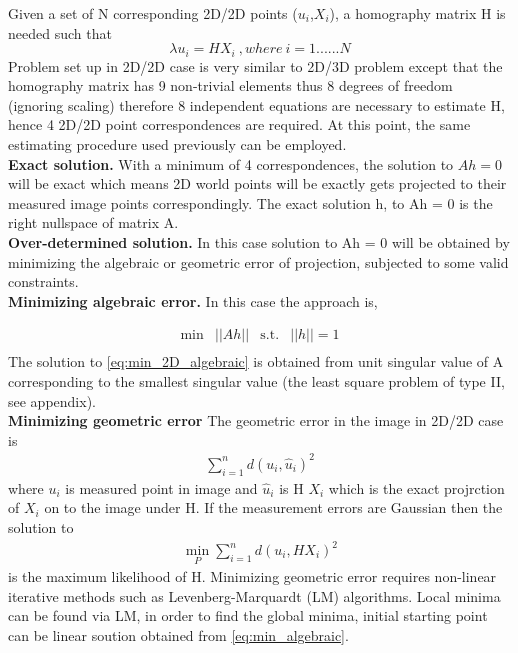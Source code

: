 Given a set of N corresponding 2D/2D points (\textbf{$u_i$},\textbf{$X_i$}), a homography matrix H is needed such that
\begin{equation*}
	\lambda\textbf{$u_i$} = H \textbf{$X_i$}\ ,  where\ i = 1......N
\end{equation*}
Problem set up in 2D/2D case is very similar to 2D/3D problem except that the homography matrix has 9 non-trivial elements thus 8 degrees of freedom (ignoring scaling) therefore 8 independent equations are necessary to estimate H, hence 4 2D/2D point correspondences are required. At this point, the same estimating procedure used previously can be employed.\\

\textbf{Exact solution.} With a minimum of 4 correspondences, the solution to $Ah = 0 $ will be exact which means 2D world points will be exactly gets projected to their measured image points correspondingly. The exact solution h, to Ah = 0 is the right nullspace of matrix A.\\

\textbf{Over-determined solution.} In this case solution to Ah = 0 will be obtained by minimizing the algebraic or geometric error of projection, subjected to some valid constraints.\\ 

\textbf{Minimizing algebraic error.} In this case the approach is,   

\begin{equation}
\begin{matrix}
\displaystyle \min & ||Ah|| & \textrm{s.t.} & ||h|| = 1\\
\end{matrix}
\label{eq:min_2D_algebraic}
\end{equation}
The solution to \cref{eq:min_2D_algebraic} is obtained from unit singular value of A corresponding to the smallest singular value (the least square problem of type II, see appendix).\\

\textbf{Minimizing geometric error} The geometric error in the image in 2D/2D case is
\begin{equation*}
\begin{matrix}
\displaystyle \sum_{i=1}^{n} d (u_i, \hat{u}_i)^2 
\end{matrix}
\end{equation*}
where $u_i$ is measured point in image and $\hat{u}_i$ is H \textbf{$X_i$} which is the exact projrction of \textbf{$X_i$} on to the image under H. If the measurement errors are Gaussian then the solution to 
\begin{equation}
\begin{matrix}
\displaystyle \min_{P} \sum_{i=1}^{n} d (u_i, H\textbf{$X_i$})^2 
\end{matrix}
\label{eq:min_geometric}
\end{equation}
is the maximum likelihood of H. Minimizing geometric error requires non-linear iterative methods such as Levenberg-Marquardt (LM) algorithms. Local minima can be found via LM, in order to find the global minima, initial starting point can be linear soution obtained from \ref{eq:min_algebraic}.\\

